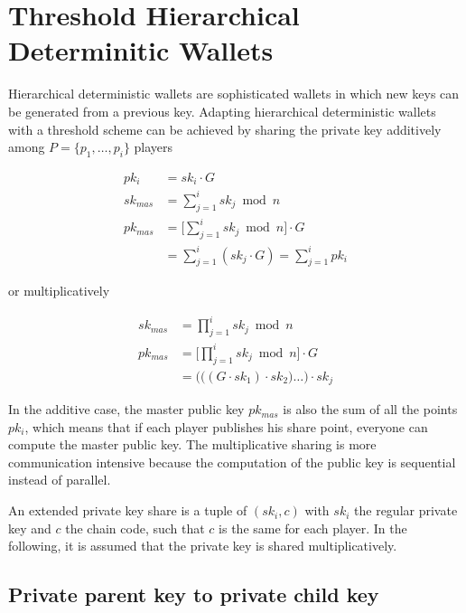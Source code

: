 \section{Threshold Hierarchical Determinitic Wallets}

Hierarchical deterministic wallets are sophisticated wallets in which new keys
can be generated from a previous key. Adapting hierarchical deterministic
wallets with a threshold scheme can be achieved by sharing the private key
additively among $P = \{p_1, \dots, p_{i}\}$ players

\begin{equation*}
\begin{split}
  pk_i     &= sk_i \cdot G \\
  sk_{mas} &= \sum_{j=1}^{i} sk_j \bmod n \\
  pk_{mas} &= \Bigg[ \sum_{j=1}^{i} sk_j \bmod n \Bigg] \cdot G \\
           &= \sum_{j=1}^{i} (sk_j \cdot G) = \sum_{j=1}^{i} pk_i
\end{split}
\end{equation*}

or multiplicatively

\begin{equation*}
\begin{split}
  sk_{mas} &= \prod_{j=1}^{i} sk_j \bmod n \\
  pk_{mas} &= \Bigg[ \prod_{j=1}^{i} sk_j \bmod n \Bigg] \cdot G \\
           &= \Big(\big((G \cdot sk_1) \cdot sk_2\big) \dots \Big)\cdot sk_j
\end{split}
\end{equation*}

In the additive case, the master public key $pk_{mas}$ is also the sum of all
the points $pk_i$, which means that if each player publishes his share point,
everyone can compute the master public key. The multiplicative sharing is more
communication intensive because the computation of the public key is sequential
instead of parallel.

An extended private key share is a tuple of $(sk_i, c)$ with $sk_i$ the regular
private key and $c$ the chain code, such that $c$ is the same for each player.
In the following, it is assumed that the private key is shared multiplicatively.

\subsection{Private parent key to private child key}

